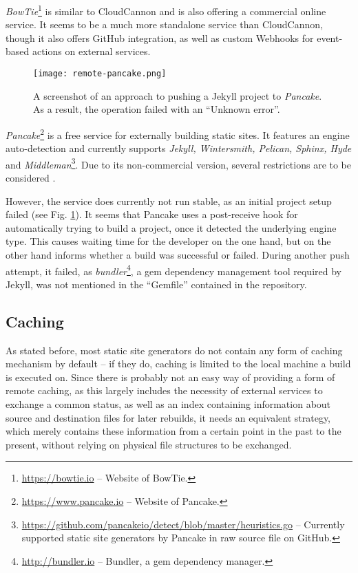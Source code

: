 \emph{BowTie}\footnote{\url{https://bowtie.io} -- Website of BowTie.} is similar to CloudCannon and is also offering a commercial online service. It seems to be a much more standalone service than CloudCannon, though it also offers GitHub integration, as well as custom Webhooks for event-based actions on external services.

\begin{figure} %
    \centering
    \texttt{[image: remote-pancake.png]}
    \caption{A screenshot of an approach to pushing a Jekyll project to \emph{Pancake}. As a result, the operation failed with an ``Unknown error''.}
    \label{fig:remote-pancake}
\end{figure}
%
\emph{Pancake}\footnote{\url{https://www.pancake.io} -- Website of Pancake.} is a free service for externally building static sites. It features an engine auto-detection and currently supports \emph{Jekyll, Wintersmith, Pelican, Sphinx, Hyde} and \emph{Middleman}\footnote{\url{https://github.com/pancakeio/detect/blob/master/heuristics.go} -- Currently supported static site generators by Pancake in raw source file on GitHub.}. Due to its non-commercial version, several restrictions are to be considered \cite{PancakeGitProjects}.

However, the service does currently not run stable, as an initial project setup failed (see Fig. \ref{fig:remote-pancake}). It seems that Pancake uses a post-receive hook for automatically trying to build a project, once it detected the underlying engine type. This causes waiting time for the developer on the one hand, but on the other hand informs whether a build was successful or failed. During another push attempt, it failed, as \emph{bundler}\footnote{\url{http://bundler.io} -- Bundler, a gem dependency manager.}, a gem dependency management tool required by Jekyll, was not mentioned in the ``Gemfile'' contained in the repository.

\subsection{Caching}
\label{sec:solutions-caching}

As stated before, most static site generators do not contain any form of caching mechanism by default -- if they do, caching is limited to the local machine a build is executed on. Since there is probably not an easy way of providing a form of remote caching, as this largely includes the necessity of external services to exchange a common status, as well as an index containing information about source and destination files for later rebuilds, it needs an equivalent strategy, which merely contains these information from a certain point in the past to the present, without relying on physical file structures to be exchanged.

